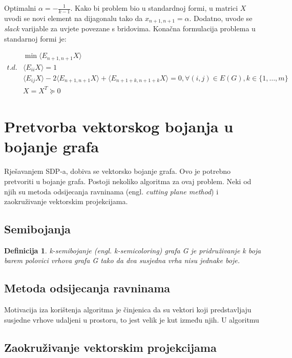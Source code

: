 \documentclass[diplomskirad]{fer}
\newtheorem{definicija}{Definicija}
\begin{document}
Optimalni $\alpha = -\frac{1}{k-1}$. Kako bi problem bio u standardnoj formi, u matrici $X$ uvodi se novi element na dijagonalu tako da
$x_{n+1,n+1} = \alpha$. Dodatno, uvode se \textit{slack} varijable za uvjete povezane s bridovima. Konačna formulacija problema u standarnoj formi je: 


\begin{equation}
  \begin{split}
    & \min \langle E_{n+1,n+1}X \rangle \\
    t.d. & \langle E_{ii}X \rangle = 1 \\
         & \langle E_{ij}X \rangle - 2 \langle E_{n+1,n+1}X \rangle + \langle E_{n+1+k,n+1+k}X \rangle = 0, \forall (i,j) \in E(G), k \in \{1,\dots,m\} \\
         & X=X^T \succeq 0 
  \end{split}
\end{equation}

\section{Pretvorba vektorskog bojanja u bojanje grafa}
Rješavanjem SDP-a, dobiva se vektorsko bojanje grafa. Ovo je potrebno pretvoriti u bojanje grafa. Postoji nekoliko algoritma za ovaj problem. Neki od njih su metoda odsijecanja ravninama 
(engl. \textit{cutting plane method}) i zaokruživanje vektorskim projekcijama.

\subsection{Semibojanja}
\begin{definicija}
  k-semibojanje (engl. \textit{k-semicoloring}) grafa G je pridruživanje k boja barem polovici vrhova grafa G tako da dva susjedna vrha nisu jednake boje. 
\end{definicija}

\subsection{Metoda odsijecanja ravninama}
Motivacija iza korištenja algoritma je činjenica da su vektori koji predstavljaju susjedne vrhove udaljeni u prostoru, to jest velik je kut između njih. U algoritmu 

\subsection{Zaokruživanje vektorskim projekcijama}
\end{document}
